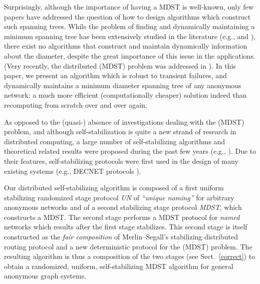 \documentclass[10pt]{article}
\begin{document}
Surprisingly, although the importance of having a MDST is well-known,
only few papers have addressed the question of how to design
algorithms which construct such spanning trees.  While the problem of
finding and dynamically maintaining a minimum spanning tree has been
extensively studied in the literature (e.g., \cite{Awer87,GaHS83} and
\cite{AwCK90,EITT+92}), there exist no algorithms that
construct and maintain dynamically information about the diameter,
despite the great importance of this issue in the applications. (Very
recently, the distributed (MDST) problem was addressed in
\cite{BuBu93b,Lava95}). In this paper, we present an algorithm which
is robust to transient failures, and dynamically maintains a minimum
diameter spanning tree of any anonymous network: a much more efficient
(computationally cheaper) solution indeed than recomputing from
scratch over and over again.

As opposed to the (quasi-) absence of investigations dealing with the
(MDST) problem, and although self-stabilization is quite a new strand
of research in distributed computing, a large number of
self-stabilizing algorithms and theoretical related results were
proposed during the past few years (e.g.,
\cite{AfBr89,AnEH92,AKMP+93,APVD94,DoIM91a,DoIM91b,DoIM93,DoIM95b,KaPe93,ShRR95,Varg94}).  Due to their features,
self-stabilizing protocols were first used in the design of many
existing systems (e.g., DECNET protocols \cite {Perl83}).

Our distributed self-stabilizing algorithm is composed of a first
uniform stabilizing randomized stage protocol {\em UN} of {\em
``unique naming''} for arbitrary anonymous networks and of a second
stabilizing stage protocol {\em MDST}, which constructs a MDST. The
second stage performs a MDST protocol for {\em named} networks which
results after the first stage stabilizes.  This second stage is itself
constructed as the {\em fair composition}
\cite{DoIM93,DoIM95b,ShRR95} of Merlin--Segall's stabilizing
distributed routing protocol and a new deterministic
protocol for the (MDST) problem. The resulting algorithm  is
thus a composition of the two stages (see Sect.~\ref{correct})
to obtain a randomized, uniform, self-stabilizing MDST algorithm 
for general anonymous graph systems.
\end{document}
